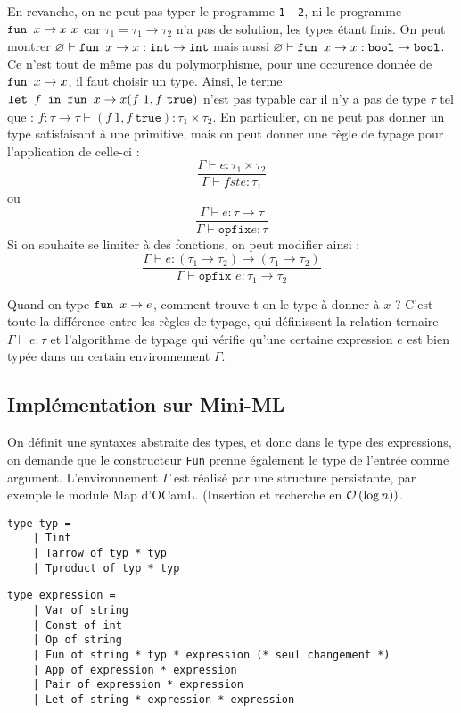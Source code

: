 \documentclass{cours}
\begin{document}
En revanche, on ne peut pas typer le programme \texttt{1 \ 2}, ni le programme $\texttt{fun } x \rightarrow x \ x$ car $\tau_{1} = \tau_{1} \rightarrow \tau_{2}$ n'a pas de solution, les types étant finis.
On peut montrer $\varnothing \vdash \texttt{fun } x \rightarrow x : \texttt{int} \rightarrow \texttt{int}$ mais aussi $\varnothing \vdash \texttt{fun } x \rightarrow x : \texttt{bool} \rightarrow \texttt{bool}$. Ce n'est tout de même pas du polymorphisme, pour une occurence donnée de $\texttt{fun } x \rightarrow x$, il faut choisir un type.
Ainsi, le terme $\letin{f}{\fun{x}{x}} (f\ 1, f\ \texttt{true})$ n'est pas typable car il n'y a pas de type $\tau$ tel que : $f : \tau \rightarrow \tau \vdash (f\ 1, f\ \texttt{true}) : \tau_{1} \times \tau_{2}$.
En particulier, on ne peut pas donner un type satisfaisant à une primitive, mais on peut donner une règle de typage pour l'application de celle-ci :
\[
    \frac{\Gamma \vdash e : \tau_{1} \times \tau_{2}}{\Gamma \vdash fst e : \tau_{1}}    
\]
ou
\[
    \frac{\Gamma \vdash e: \tau \rightarrow \tau}{\Gamma \vdash \texttt{opfix} e : \tau}
\]
Si on souhaite se limiter à des fonctions, on peut modifier ainsi : 
\[
    \frac{\Gamma \vdash e : \left(\tau_{1} \rightarrow \tau_{2}\right) \rightarrow \left(\tau_{1} \rightarrow \tau_{2}\right)}{\Gamma \vdash \texttt{opfix } e : \tau_{1} \rightarrow \tau_{2}}
\]

Quand on type $\texttt{fun } x \rightarrow e$, comment trouve-t-on le type à donner à $x$ ? C'est toute la différence entre les règles de typage, qui définissent la relation ternaire $\Gamma \vdash e : \tau$ et l'algorithme de typage qui vérifie qu'une certaine expression $e$ est bien typée dans un certain environnement $\Gamma$.

\subsection{Implémentation sur Mini-ML}
On définit une syntaxes abstraite des types, et donc dans le type des expressions, on demande que le constructeur \texttt{Fun} prenne également le type de l'entrée comme argument.
L'environnement $\Gamma$ est réalisé par une structure persistante, par exemple le module Map d'OCamL. (Insertion et recherche en $\mathcal{O}\left(\log n\right))$.

\begin{verbatim}
type typ =
    | Tint
    | Tarrow of typ * typ
    | Tproduct of typ * typ
\end{verbatim}

\begin{verbatim}
type expression =
    | Var of string
    | Const of int
    | Op of string
    | Fun of string * typ * expression (* seul changement *)
    | App of expression * expression
    | Pair of expression * expression
    | Let of string * expression * expression
\end{verbatim}
\end{document}
